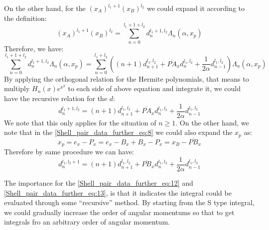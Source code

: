 On the other hand, for the $(x_{A})^{l_{1}+1}(x_{B})^{l_{2}}$ we could expand it according to
the definition:
\begin{equation}
 \label{Shell_pair_data_further_eq:10}
(x_{A})^{l_{1}+1}(x_{B})^{l_{2}}  = 
\sum^{l_{1}+1+l_{2}}_{n=0}d^{l_{1}+1,l_{2}}_{n}\Lambda_{n}(\alpha, x_{p})
\end{equation}
Therefore, we have:
\begin{equation}
 \label{Shell_pair_data_further_eq:11}
\sum^{l_{1}+1+l_{2}}_{n=0}d^{l_{1}+1,l_{2}}_{n}\Lambda_{n}(\alpha, x_{p}) =
\sum^{l_{1}+l_{2}}_{n=0}\left(
(n+1)d^{l_{1},l_{2}}_{n+1}             + 
\overline{PA}_{x}d^{l_{1},l_{2}}_{n}   +
\frac{1}{2\alpha}d^{l_{1},l_{2}}_{n-1}
 \right)\Lambda_{n}(\alpha,x_{p})
\end{equation}
By applying the orthogonal relation for the Hermite polynomials, that means to multiply
$H_{n}(x)e^{x^{2}}$ to each side of above equation and integrate it, we could have the 
recursive relation for the $d$:
\begin{equation}
 \label{Shell_pair_data_further_eq:12}
d^{l_{1}+1,l_{2}}_{n} = (n+1)d^{l_{1},l_{2}}_{n+1}             + 
\overline{PA}_{x}d^{l_{1},l_{2}}_{n}   +
\frac{1}{2\alpha}d^{l_{1},l_{2}}_{n-1}
\end{equation}
We note that this only applies for the situation of $n\geq 1$. On the other hand, we note
that in the \ref{Shell_pair_data_further_eq:8} we could also expand the $x_{p}$ as:
\begin{equation}
 x_{p} = e_{x} - P_{x} = e_{x} - B_{x} + B_{x} - P_{x} = 
x_{B} - \overline{PB}_{x} 
\end{equation}
Therefore by same procedure we can have:
\begin{equation}
 \label{Shell_pair_data_further_eq:13}
d^{l_{1},l_{2}+1}_{n} = (n+1)d^{l_{1},l_{2}}_{n+1}             + 
\overline{PB}_{x}d^{l_{1},l_{2}}_{n}   +
\frac{1}{2\alpha}d^{l_{1},l_{2}}_{n-1}
\end{equation}

The importance for the \ref{Shell_pair_data_further_eq:12} and \ref{Shell_pair_data_further_eq:13},
is that it indicates the integral could be evaluated through some ``recursive'' method. By starting
from the S type integral, we could gradually increase the order of angular momentums so that to
get integrals fro an arbitrary order of angular momentum. 
 
